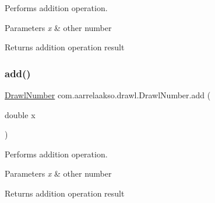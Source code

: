 Performs addition operation. 


\begin{DoxyParams}{Parameters}
{\em x} & other number \\
\hline
\end{DoxyParams}
\begin{DoxyReturn}{Returns}
addition operation result 
\end{DoxyReturn}
\mbox{\label{classcom_1_1aarrelaakso_1_1drawl_1_1_drawl_number_ad8a8c1d2ce5aa63334b2bdce9bd7bb54}} 
\subsubsection{\texorpdfstring{add()}{add()}\hspace{0.1cm}{\footnotesize\ttfamily [2/3]}}
{\footnotesize\ttfamily \hyperlink{classcom_1_1aarrelaakso_1_1drawl_1_1_drawl_number}{Drawl\+Number} com.\+aarrelaakso.\+drawl.\+Drawl\+Number.\+add (\begin{DoxyParamCaption}\item[{double}]{x }\end{DoxyParamCaption})\hspace{0.3cm}{\ttfamily [protected]}}



Performs addition operation. 


\begin{DoxyParams}{Parameters}
{\em x} & other number \\
\hline
\end{DoxyParams}
\begin{DoxyReturn}{Returns}
addition operation result 
\end{DoxyReturn}
\mbox{\label{classcom_1_1aarrelaakso_1_1drawl_1_1_drawl_number_a662ec93df5afeaa42ce9aee206625338}} 

